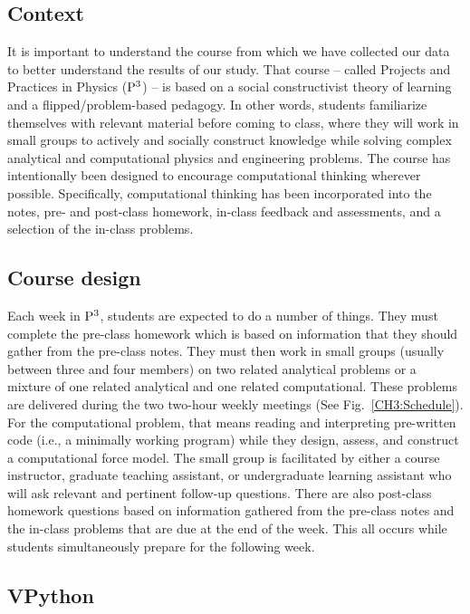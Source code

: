 \documentclass{msuphddissertation}
\begin{document}
\begin{doublespace}
%
%

\chapter{Context}\label{CH3:Context}

It is important to understand the course from which we have collected our data to better understand the results of our study.  That course -- called Projects and Practices in Physics (${\rm P}^{3}$) -- is based on a social constructivist theory of learning and a flipped/problem-based pedagogy.  In other words, students familiarize themselves with relevant material before coming to class, where they will work in small groups to actively and socially construct knowledge while solving complex analytical and computational physics and engineering problems.  The course has intentionally been designed to encourage computational thinking wherever possible.  Specifically, computational thinking has been incorporated into the notes, pre- and post-class homework, in-class feedback and assessments, and a selection of the in-class problems.

\section{Course design}

Each week in ${\rm P}^{3}$, students are expected to do a number of things. They must complete the pre-class homework which is based on information that they should gather from the pre-class notes.  They must then work in small groups (usually between three and four members) on two related analytical problems or a mixture of one related analytical and one related computational.  These problems are delivered during the two two-hour weekly meetings (See Fig.~\ref{CH3:Schedule}).  For the computational problem, that means reading and interpreting pre-written code (i.e., a minimally working program) while they design, assess, and construct a computational force model.  The small group is facilitated by either a course instructor, graduate teaching assistant, or undergraduate learning assistant who will ask relevant and pertinent follow-up questions.  There are also post-class homework questions based on information gathered from the pre-class notes and the in-class problems that are due at the end of the week.  This all occurs while students simultaneously prepare for the following week.

\section{VPython}


\end{doublespace}
\end{document}
